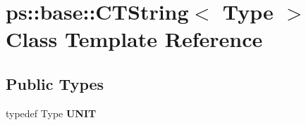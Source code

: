 \hypertarget{classps_1_1base_1_1CTString}{}\section{ps\+:\+:base\+:\+:C\+T\+String$<$ Type $>$ Class Template Reference}
\label{classps_1_1base_1_1CTString}
\subsection*{Public Types}
\begin{DoxyCompactItemize}
\item 
\hypertarget{classps_1_1base_1_1CTString_a40aaf8a10c42de782202ba6f7285e359}{}typedef Type {\bfseries U\+N\+I\+T}\label{classps_1_1base_1_1CTString_a40aaf8a10c42de782202ba6f7285e359}

\end{DoxyCompactItemize}

